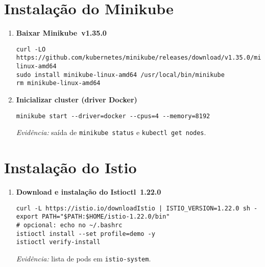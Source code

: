\documentclass[12pt,a4paper]{report}
\begin{document}
\section{Instalação do Minikube}
\begin{enumerate}[label=\arabic*.]
\item\textbf{Baixar Minikube v1.35.0}
\begin{verbatim}
curl -LO https://github.com/kubernetes/minikube/releases/download/v1.35.0/minikube-linux-amd64
sudo install minikube-linux-amd64 /usr/local/bin/minikube
rm minikube-linux-amd64
\end{verbatim}
\item\textbf{Inicializar cluster (driver Docker)}
\begin{verbatim}
minikube start --driver=docker --cpus=4 --memory=8192
\end{verbatim}
\textit{Evidência:} saída de \texttt{minikube status} e \texttt{kubectl get nodes}.\\
\vspace{2cm}
\end{enumerate}

\section{Instalação do Istio}
\begin{enumerate}[label=\arabic*.]
\item\textbf{Download e instalação do Istioctl 1.22.0}
\begin{verbatim}
curl -L https://istio.io/downloadIstio | ISTIO_VERSION=1.22.0 sh -
export PATH="$PATH:$HOME/istio-1.22.0/bin"
# opcional: echo no ~/.bashrc
istioctl install --set profile=demo -y
istioctl verify-install
\end{verbatim}
\textit{Evidência:} lista de pods em \texttt{istio-system}.\\
\vspace{2cm}
\end{enumerate}
\end{document}
